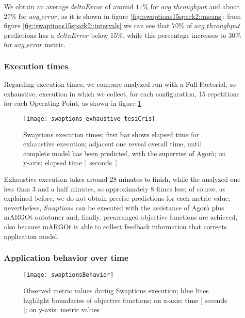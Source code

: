 We obtain an average $deltaError$ of around $11\%$ for $avg\_throughput$ and about $27\%$ for $avg\_error$, as it is shown in figure \ref{fig::swaptions15spark2::means}; from figure \ref{fig::swaptions15spark2::intervals} we can see that $70\%$ of $avg\_throughput$ predictions has a $deltaError$ below $15\%$, while this percentage increases to $30\%$ for $avg\_error$ metric.


\subsubsection{Execution times}

Regarding execution times, we compare analyzed run with a Full-Factorial, so exhaustive, execution in which we collect, for each configuration, 15 repetitions for each Operating Point, as shown in figure \ref{fig::sw::execT}:

\begin{figure}[H]

    \centering
    
    \texttt{[image: swaptions\_exhaustive\_tesiCris]}
    
    \caption[Swaptions execution times]{Swaptions execution times; first bar shows elapsed time for exhaustive execution; adjacent one reveal overall time, until complete model has been predicted, with the supervise of Agorà; on y-axis: elapsed time \hbox{[ seconds ]}}
    
    \label{fig::sw::execT}
    
\end{figure}

Exhaustive execution takes around 28 minutes to finish, while the analyzed one less than 3 and a half minutes, so approximately 8 times less; of course, as explained before, we do not obtain precise predictions for each metric value; nevertheless, \textit{Swaptions} can be executed with the assistance of Agorà plus mARGOt autotuner and, finally, prearranged objective functions are achieved, also because mARGOt is able to collect feedback information that corrects application model.


\subsubsection{Application behavior over time}

\begin{figure}[H]

    \centering
    
    \texttt{[image: swaptionsBehavior]}
    
    \caption[Observed metric values during Swaptions execution]{Observed metric values during Swaptions execution; blue lines highlight boundaries of objective functions; on x-axis: time [ seconds ]; on y-axis: metric values}
    
    \label{fig::sw::beh}
    
\end{figure}

